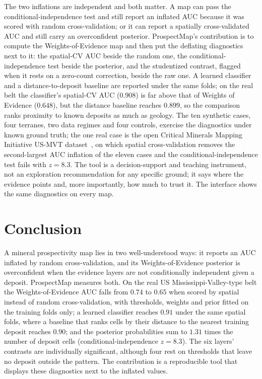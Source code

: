 \documentclass[journal]{IEEEtran}
\begin{document}
The two inflations are independent and both matter. A map can pass the conditional-independence test and still
report an inflated AUC because it was scored with random cross-validation; or it can report a spatially
cross-validated AUC and still carry an overconfident posterior. ProspectMap's contribution is to compute the
Weights-of-Evidence map and then put the deflating diagnostics next to it: the spatial-CV AUC beside the random
one, the conditional-independence test beside the posterior, and the studentized contrast, flagged when it rests
on a zero-count correction, beside the raw one. A learned classifier and a distance-to-deposit baseline are
reported under the same folds; on the real belt the classifier's spatial-CV AUC ($0.908$) is far above that of
Weights of Evidence ($0.648$), but the distance baseline reaches $0.899$, so the comparison ranks proximity to
known deposits as much as geology. The ten synthetic cases, four terranes, two data regimes and four controls,
exercise the diagnostics under known ground truth; the one real case is the open Critical Minerals Mapping
Initiative US-MVT dataset~\cite{lawley}, on which spatial cross-validation removes the second-largest AUC
inflation of the eleven cases and the conditional-independence test fails with $z = 8.3$. The tool is a
decision-support and teaching instrument, not an exploration recommendation for any specific ground; it says where
the evidence points and, more importantly, how much to trust it. The interface shows the same diagnostics on
every map.

\section{Conclusion}

A mineral prospectivity map lies in two well-understood ways: it reports an AUC inflated by random
cross-validation, and its Weights-of-Evidence posterior is overconfident when the evidence layers are not
conditionally independent given a deposit. ProspectMap measures both. On the real US Mississippi-Valley-type belt
the Weights-of-Evidence AUC falls from $0.74$ to $0.65$ when scored by spatial instead of random
cross-validation, with thresholds, weights and prior fitted on the training folds only; a learned classifier
reaches $0.91$ under the same spatial folds, where a baseline that ranks cells by their distance to the nearest
training deposit reaches $0.90$; and the posterior probabilities sum to $1.31$ times the number of deposit cells
(conditional-independence $z = 8.3$). The six layers' contrasts are individually significant, although four rest
on thresholds that leave no deposit outside the pattern. The contribution is a reproducible tool that displays
these diagnostics next to the inflated values.
\end{document}
